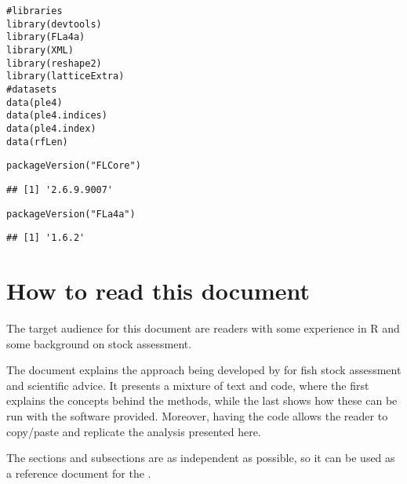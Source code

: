\documentclass[a4paper,english,10pt]{article}\usepackage[]{graphicx}\usepackage[]{color}
\makeatletter
\newcommand{\hlstr}[1]{\textcolor[rgb]{0.063,0.58,0.627}{#1}}%
\newcommand{\hlcom}[1]{\textcolor[rgb]{0.588,0.588,0.588}{#1}}%
\newcommand{\hlstd}[1]{\textcolor[rgb]{0.196,0.196,0.196}{#1}}%
\newcommand{\hlkwd}[1]{\textcolor[rgb]{0.78,0.227,0.412}{#1}}%
\newenvironment{kframe}{%
 \def\at@end@of@kframe{}%
 \ifinner\ifhmode%
  \def\at@end@of@kframe{\end{minipage}}%
  \begin{minipage}{\columnwidth}%
 \fi\fi%
 \def\FrameCommand##1{\hskip\@totalleftmargin \hskip-\fboxsep
 \colorbox{shadecolor}{##1}\hskip-\fboxsep
     \hskip-\linewidth \hskip-\@totalleftmargin \hskip\columnwidth}%
 \MakeFramed {\advance\hsize-\width
   \@totalleftmargin\z@ \linewidth\hsize
   \@setminipage}}%
 {\par\unskip\endMakeFramed%
 \at@end@of@kframe}
\newenvironment{knitrout}{}{} %
\makeatother
\begin{document}
\begin{knitrout}
\color{fgcolor}\begin{kframe}
\begin{alltt}
\hlcom{# libraries}
\hlkwd{library}\hlstd{(devtools)}
\hlkwd{library}\hlstd{(FLa4a)}
\hlkwd{library}\hlstd{(XML)}
\hlkwd{library}\hlstd{(reshape2)}
\hlkwd{library}\hlstd{(latticeExtra)}
\hlcom{# datasets}
\hlkwd{data}\hlstd{(ple4)}
\hlkwd{data}\hlstd{(ple4.indices)}
\hlkwd{data}\hlstd{(ple4.index)}
\hlkwd{data}\hlstd{(rfLen)}
\end{alltt}
\end{kframe}
\end{knitrout}

\begin{knitrout}
\color{fgcolor}\begin{kframe}
\begin{alltt}
\hlkwd{packageVersion}\hlstd{(}\hlstr{"FLCore"}\hlstd{)}
\end{alltt}
\begin{verbatim}
## [1] '2.6.9.9007'
\end{verbatim}
\begin{alltt}
\hlkwd{packageVersion}\hlstd{(}\hlstr{"FLa4a"}\hlstd{)}
\end{alltt}
\begin{verbatim}
## [1] '1.6.2'
\end{verbatim}
\end{kframe}
\end{knitrout}



\section{How to read this document}

The target audience for this document are readers with some experience in R and some background on stock assessment.

The document explains the approach being developed by \aFa for fish stock assessment and scientific advice. It presents a mixture of text and code, where the first explains the concepts behind the methods, while the last shows how these can be run with the software provided. Moreover, having the code allows the reader to copy/paste and replicate the analysis presented here.

The sections and subsections are as independent as possible, so it can be used as a reference document for the . 
\end{document}
